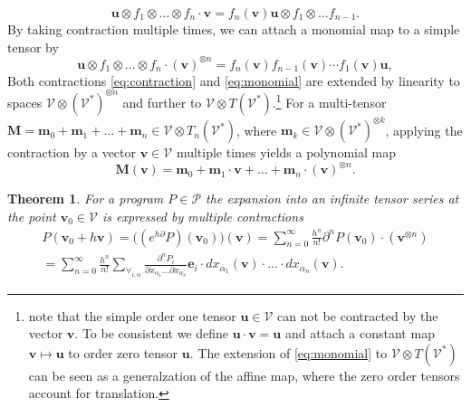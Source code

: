 \documentclass[smallcondensed]{svjour3}
\newcommand{\bfM}{\mathbf{M}}
\newcommand{\bfm}{\mathbf{m}}
\newcommand{\VV}{\mathcal{V}}
\newcommand{\e}{\mathbf{e}}
\newcommand{\uu}{\mathbf{u}}
\newcommand{\vv}{\mathbf{v}}
\newcommand{\dP}{\mathcal{P}}
\newcommand{\D}{\partial}
\newtheorem{izrek}{Theorem}[section]
\begin{document}
 \begin{equation}
   \label{eq:contraction}
 \uu\otimes f_1\otimes\ldots\otimes f_n\cdot \vv = f_n(\vv) \uu\otimes f_1\otimes\ldots f_{n-1}.
\end{equation}
By taking contraction multiple times, we can attach a monomial map to a
simple tensor by  
 \begin{equation}
   \label{eq:monomial}
 \uu\otimes f_1\otimes\ldots\otimes f_n\cdot (\vv)^{\otimes n} = f_n(\vv)f_{n-1}(\vv)\cdots f_1(\vv) \uu,
\end{equation}
Both contractions \eqref{eq:contraction} and \eqref{eq:monomial} are extended
by linearity to spaces $\VV\otimes \left(\VV^*\right)^{\otimes n}$ and further
to $\VV\otimes T(\VV^*)$.\footnote{note that the simple order one tensor
  $\uu\in\VV$ can not be contracted by the vector $\vv$. To be consistent we
  define $\uu\cdot \vv = \uu$ and attach a constant map
  $\vv\mapsto \uu$ to order zero tensor $\uu$. The extension of
  \eqref{eq:monomial}
  to $\VV\otimes T(\VV^*)$ can be seen as a generalzation of the affine map,
  where the zero order tensors account for translation.}
For a multi-tensor $\bfM=\bfm_0+\bfm_1+\ldots+\bfm_n\in\VV\otimes T_n(\VV^*)$,
where $\bfm_k\in\VV\otimes\left( \VV^*\right)^{\otimes k}$, applying the
contraction by a vector $\vv\in \VV$ multiple times yields a polynomial map
\begin{equation}
  \label{eq:polynomial_tensor}
  \bfM(\vv) = \bfm_0+\bfm_1\cdot \vv+\ldots+\bfm_n\cdot (\vv)^{\otimes n}.
\end{equation}
\begin{izrek}\label{izr:e^d}
	For a program $P\in\dP$  the expansion into an infinite tensor series
  at the point $\vv_0\in \VV$ is expressed by multiple contractions 
	\begin{multline}\label{eq:tenzorVrsta}
	P(\vv_0+h\vv) = \Big((e^{h\D}P)(\vv_0)\Big)(\vv)
  = \sum_{n=0}^\infty\frac{h^n}{n!}\D^nP(\vv_0)\cdot (\vv^{\otimes n})\\
  = \sum_{n=0}^\infty \frac{h^n}{n!}\sum_{\forall_{i,\alpha}}\frac{\partial^nP_i}{\partial
 		    x_{\alpha_1}\ldots \partial x_{\alpha_n}}\e_i\cdot
 		  dx_{\alpha_1}(\vv)\cdot\ldots \cdot dx_{\alpha_n}(\vv).
	\end{multline}
\end{izrek}
 
\end{document}
